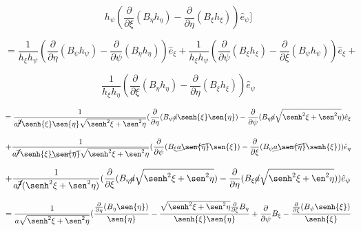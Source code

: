 \documentclass[12pt,a4paper]{article}
\begin{document}
\begin{enumerate}
\begin{enumerate}
        \begin{equation*}
             h_\psi (\frac{\partial}{\partial \xi}(B_\eta h_\eta) - \frac{\partial}{\partial \eta}(B_\xi h_\xi))\hat{e}_\psi]
        \end{equation*}
        
        \begin{equation*}
            = \frac{1}{h_\xi h_\psi}(\frac{\partial}{\partial \eta} (B_\psi h_\psi)- \frac{\partial}{\partial \psi} (B_\eta h_\eta)) \hat{e}_\xi + \frac{1}{h_\xi h_\psi} (\frac{\partial}{\partial \psi}(B_\xi h_\xi) - \frac{\partial}{\partial \xi}(B_\psi h_\psi)) \hat{e}_\xi +
        \end{equation*}
        
        \begin{equation*}
            \frac{1}{h_\xi h_\eta}(\frac{\partial}{\partial \xi}(B_\eta h_\eta)- \frac{\partial}{ \partial \eta}(B_\xi h_\xi)) \hat{e}_\psi
        \end{equation*}
        
        \begin{equation*}
            = \frac{1}{a\cancel{^2} \senh{\xi}\sen{\eta}\sqrt{\senh^2{\xi} + \sen^2{\eta}}}(\frac{\partial}{\partial \eta}(B_\psi \cancel{a}\senh{\xi} \sen{\eta}) - \frac{\partial}{\partial \psi}(B_\eta  \cancel{a} \sqrt{\senh^2{\xi}+ \sen^2{\eta}}) \hat{e}_\xi
        \end{equation*}
        
        \begin{equation*}
            + \frac{1}{a\cancel{^2}\senh{\xi}\cancel{\sen{\eta}} \sqrt{\senh^2{\xi}+ \sen^2{\eta}}} (\frac{\partial}{\partial \psi} (B_\xi \cancel{a \sen{\eta}}\sen{\xi}) - \frac{\partial}{\partial \xi}(B_\psi \cancel{a \sen{\eta}} \senh{\xi})) \hat{e}_\eta
        \end{equation*}
        
        \begin{equation*}
            + \frac{1}{a\cancel{^2} (\senh^2{\xi} + \sen^2{\eta})}(\frac{\partial}{\partial \xi}(B_\eta \cancel{a} \sqrt{\senh^2{\xi} + \sen^2{\eta}}) - \frac{\partial}{\partial \eta}(B_\xi \cancel{a} \sqrt{\senh^2{\xi} + \en^2{\eta}})) \hat{e}_\psi
        \end{equation*}
        
        \begin{equation*}
            = \frac{1}{a \sqrt{\senh^2{\xi} + \sen^2{\eta}}}(\frac{\frac{\partial}{\partial \eta}(B_\eta \sen{\eta})}{\sen{\eta}} - \frac{\sqrt{\senh^2{\xi} + \sen^2{\eta}} \frac{\partial}{\partial \xi} B_\eta}{\senh{\xi} \sen{\eta}} + \frac{\partial}{\partial \psi} B_\xi - \frac{\frac{\partial}{\partial \xi}(B_\psi \senh{\xi})}{\senh{\xi}}
        \end{equation*}
        

\end{enumerate}
\end{enumerate}
\end{document}
